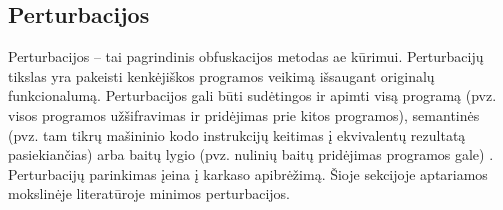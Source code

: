 \subsection{Perturbacijos}\label{sec:literature:perturbations}

Perturbacijos -- tai pagrindinis obfuskacijos metodas \ac{ae} kūrimui. Perturbacijų tikslas yra pakeisti kenkėjiškos programos veikimą išsaugant originalų funkcionalumą. Perturbacijos gali būti sudėtingos ir apimti visą programą (pvz. visos programos užšifravimas ir pridėjimas prie kitos programos), semantinės (pvz. tam tikrų mašininio kodo instrukcijų keitimas į ekvivalentų rezultatą pasiekiančias) arba baitų lygio (pvz. nulinių baitų pridėjimas programos gale) \citeplace. Perturbacijų parinkimas įeina į karkaso apibrėžimą. Šioje sekcijoje aptariamos mokslinėje literatūroje minimos perturbacijos.
